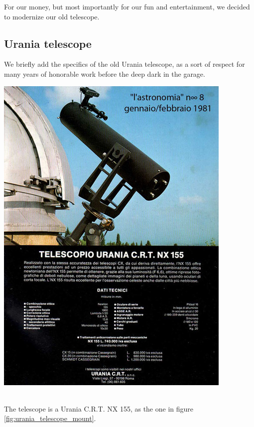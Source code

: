 \documentclass{article}
\begin{document}
\begin{multicols}{2}
        For our money, but most importantly for our fun and entertainment, we decided to modernize our old telescope.

        \subsection{Urania telescope}
        We briefly add the specifics of the old Urania telescope, as a sort of respect for many years of honorable work before the deep dark in the garage.
        \\
        \begin{minipage}{0.5\textwidth}
            \centering
            \includegraphics[scale=0.4]{urania_upper.jpg}
            \label{fig:urania_telescope_mount}
        \end{minipage}
        \\
        The telescope is a Urania C.R.T. NX 155, as the one in figure \ref{fig:urania_telescope_mount}.
        \\
        \begin{minipage}{0.5\textwidth}

\end{minipage}
\end{multicols}
\end{document}
